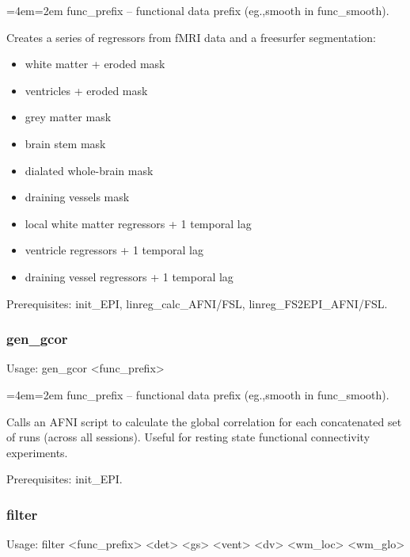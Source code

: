 \documentclass[final,titlepage,letterpaper,oneside,12pt]{article}
\renewcommand{\texttt}[2][BrickRed]{\textcolor{#1}{\ttfamily #2}}%
\newenvironment{blockquote}{%
  \par%
  \medskip
  \leftskip=4em\rightskip=2em%
  \noindent\ignorespaces}{%
  \par\medskip}
\begin{document}
\begin{blockquote}
func\_prefix -- functional data prefix (eg.,smooth in func\_smooth).
\end{blockquote}

\noindent Creates a series of regressors from fMRI data and a freesurfer segmentation: 

\begin{itemize} \itemsep-2pt
	\item{white matter + eroded mask}
	\item{ventricles + eroded mask}
	\item{grey matter mask}
	\item{brain stem mask}
	\item{dialated whole-brain mask}
	\item{draining vessels mask}
	\item{local white matter regressors + 1 temporal lag}
	\item{ventricle regressors + 1 temporal lag}
	\item{draining vessel regressors + 1 temporal lag}
\end{itemize}

Prerequisites: \texttt{init\_EPI}, \texttt{linreg\_calc\_AFNI/FSL}, \texttt{linreg\_FS2EPI\_AFNI/FSL}.

\subsubsection{gen\_gcor}
Usage: \texttt{gen\_gcor <func\_prefix>}

\begin{blockquote}
func\_prefix -- functional data prefix (eg.,smooth in func\_smooth).
\end{blockquote}

\noindent Calls an AFNI script to calculate the global correlation for each concatenated set of runs (across all sessions). Useful for resting state functional connectivity experiments.

Prerequisites: \texttt{init\_EPI}.

\subsubsection{filter}
Usage: \texttt{filter <func\_prefix> <det> <gs> <vent> <dv> <wm\_loc> <wm\_glo>}
\end{document}
